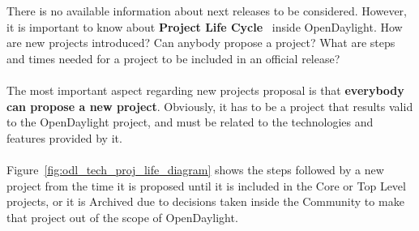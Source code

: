 \documentclass[a4paper, 12pt]{book}
\begin{document}
There is no available information about next releases to be considered. However, it is important to know about \textbf{Project Life Cycle}~\cite{OpenDaylightLifecycle} inside OpenDaylight. How are new projects introduced? Can anybody propose a project? What are steps and times needed for a project to be included in an official release?\\
\\
The most important aspect regarding new projects proposal is that \textbf{everybody can propose a new project}. Obviously, it has to be a project that results valid to the OpenDaylight project, and must be related to the technologies and features provided by it.\\
\\
Figure~\ref{fig:odl_tech_proj_life_diagram} shows the steps followed by a new project from the time it is proposed until it is included in the Core or Top Level projects, or it is Archived due to decisions taken inside the Community to make that project out of the scope of OpenDaylight.
\end{document}
